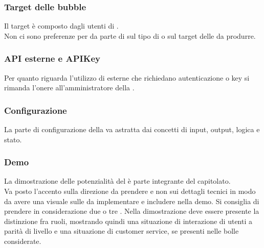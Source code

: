 \subsubsection{Target delle bubble}
Il target è composto dagli utenti di .\\
Non ci sono preferenze per da parte di \Proponente{} sul tipo di  o sul target delle  da produrre. 

\subsubsection{API esterne e APIKey}
Per quanto riguarda l'utilizzo di  esterne che richiedano autenticazione o key si rimanda l'onere all'amministratore della .

\subsubsection{Configurazione}
La parte di configurazione della  va astratta dai concetti di input, output, logica e stato.

\subsubsection{Demo}
La dimostrazione delle potenzialità del  è parte integrante del capitolato.\\
Va posto l'accento sulla direzione da prendere e non sui dettagli tecnici in modo da avere una visuale sulle  da implementare e includere nella demo. Si consiglia di prendere in considerazione due o tre .
Nella dimostrazione deve essere presente la distinzione fra ruoli, mostrando quindi una situazione di interazione di utenti a parità di livello e una situazione di customer service, se presenti nelle bolle considerate. 